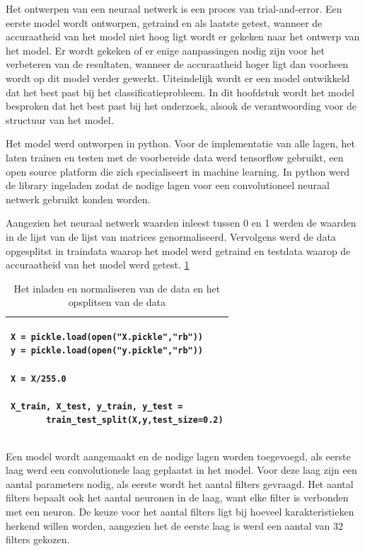 Het ontwerpen van een neuraal netwerk is een proces van trial-and-error.
Een eerste model wordt ontworpen, getraind en als laatste getest, wanneer de accuraatheid van het model niet hoog ligt wordt er gekeken naar het ontwerp van het model.
Er wordt gekeken of er enige aanpassingen nodig zijn voor het verbeteren van de resultaten, wanneer de accuraatheid hoger ligt dan voorheen wordt op dit model verder gewerkt.
Uiteindelijk wordt er een model ontwikkeld dat het best past bij het classificatieprobleem.
In dit hoofdstuk wordt het model besproken dat het best past bij het onderzoek, alsook de verantwoording voor de structuur van het model.

Het model werd ontworpen in python. Voor de implementatie van alle lagen, het laten trainen en testen met de voorbereide data werd tensorflow gebruikt, een open source platform die zich specialiseert in machine learning.
In python werd de library ingeladen zodat de nodige lagen voor een convolutioneel neuraal netwerk gebruikt konden worden.

Aangezien het neuraal netwerk waarden inleest tussen 0 en 1 werden de waarden in de lijst van de lijst van matrices genormaliseerd.
Vervolgens werd de data opgesplitst in traindata waarop het model werd getraind en testdata waarop de accuraatheid van het model werd getest.  \ref{table:DataNormalisition}



\begin{table}[!htbp]
    \begin{tabular}{|l|}
        \hline
        \begin{lstlisting}
X = pickle.load(open("X.pickle","rb"))
y = pickle.load(open("y.pickle","rb"))
       
X = X/255.0

X_train, X_test, y_train, y_test =
       train_test_split(X,y,test_size=0.2)
        \end{lstlisting}
        \\ \hline
    \end{tabular}
    \caption{Het inladen en normaliseren van de data en het opsplitsen van de data} \label{table:DataNormalisition}
\end{table}


Een model wordt aangemaakt en de nodige lagen worden toegevoegd, als eerste laag werd een convolutionele laag geplaatst in het model.
Voor deze laag zijn een aantal parameters nodig, als eerste wordt het aantal filters gevraagd. 
Het aantal filters bepaalt ook het aantal neuronen in de laag, want elke filter is verbonden met een neuron.
De keuze voor het aantal filters ligt bij hoeveel karakteristieken herkend willen worden, aangezien het de eerste laag is werd een aantal van 32 filters gekozen.

